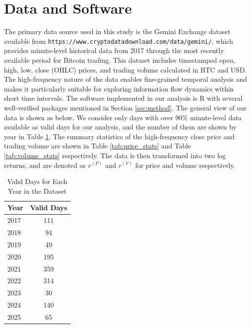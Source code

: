 \documentclass{elsarticle}
\begin{document}
\section{Data and Software}
The primary data source used in this study is the Gemini Exchange dataset available from \texttt{https://www.cryptodatadownload.com/data/gemini/}, which provides minute-level historical data from 2017 through the most recently available period for Bitcoin trading. This dataset includes timestamped open, high, low, close (OHLC) prices, and trading volume calculated in BTC and USD. The high-frequency nature of the data enables fine-grained temporal analysis and makes it particularly suitable for exploring information flow dynamics within short time intervals. The software implemented in our analysis is R with several well-verified packages mentioned in Section \ref{sec:method}. The general view of our data is shown as below. We consider only days with over 90\% minute-level data available as valid days for our analysis, and the number of them are shown by year in Table \ref{tab01_valid_days}. The summary statistics of the high-frequency close price and trading volume are shown in Table \ref{tab:price_stats} and Table \ref{tab:volume_stats} respectively. The data is then transformed into two log returns, and are denoted as $r^{(P)}$ and $r^{(V)}$ for price and volume respectively.


\begin{table}[H]
  \caption{Valid Days for Each Year in the Dataset}
  \label{tab01_valid_days}
  \centering
  \begin{tabular}{lc}
    \hline\noalign{\smallskip}
    \textbf{Year} & \textbf{Valid Days} \\
    \hline\noalign{\smallskip}
    2017 & 111 \\
    2018 & 94 \\
    2019 & 49 \\
    2020 & 195 \\
    2021 & 359 \\
    2022 & 314 \\
    2023 & 30 \\
    2024 & 140 \\
    2025 & 65 \\
    \hline
  \end{tabular}
\end{table}
\end{document}
